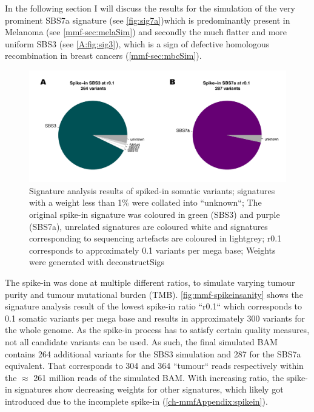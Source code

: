 In the following section I will discuss the results for the simulation of the very prominent SBS7a signature (see \autoref{fig:sig7a})which is predominantly present in Melanoma (see \autoref{mmf-sec:melaSim}) and secondly the much flatter and more uniform SBS3 (see \autoref{A:fig:sig3}), which is a sign of defective homologous recombination in breast cancers (\autoref{mmf-sec:mbcSim}). 


\begin{figure}[!ht]
\centering
\includegraphics[width=.9\linewidth]{Figures/spikeInSanityCheck.pdf}
\caption[Signature analysis of spike-in somatic variants]{Signature analysis results of spiked-in somatic variants; signatures with a weight less than 1\% were collated into ``unknown``; The original spike-in signature was coloured in green (SBS3) and purple (SBS7a), unrelated signatures are coloured white and signatures corresponding to sequencing artefacts are coloured in lightgrey; r0.1 corresponds to approximately 0.1 variants per mega base; Weights were generated with deconstructSigs \cite{Rosenthal2016} }\label{fig:mmf-spikeinsanity}
\end{figure}

The spike-in was done at multiple different ratios, to simulate varying tumour purity and tumour mutational burden (TMB). \autoref{fig:mmf-spikeinsanity} shows the signature analysis result of the lowest spike-in ratio ``r0.1`` which corresponds to 0.1 somatic variants per mega base and results in approximately 300 variants for the whole genome. As the spike-in process has to satisfy certain quality measures, not all candidate variants can be used. As such, the final simulated BAM contains 264 additional variants for the SBS3 simulation and 287 for the SBS7a equivalent. That corresponds to 304 and 364 ``tumour`` reads respectively within the $\approx$ 261 million reads of the simulated BAM. With increasing ratio, the spike-in signatures show decreasing weights for other signatures, which likely got introduced due to the incomplete spike-in (\autoref{ch-mmfAppendix:spikein}).


